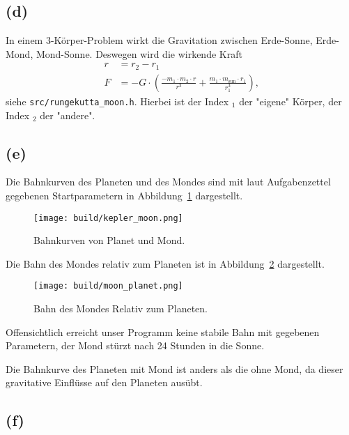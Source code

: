 \documentclass{scrartcl}
\begin{document}
\subsection*{(d)}
In einem 3-Körper-Problem wirkt die Gravitation zwischen Erde-Sonne, Erde-Mond, Mond-Sonne.
Deswegen wird die wirkende Kraft
\begin{align}
  r &= r_2 - r_1 \\
  F &= - G \cdot \left(\frac{- m_1 \cdot m_2 \cdot r}{r^3} + \frac{m_1 \cdot m_{\text{sun}} \cdot
    r_1}{r_1^3}\right)\text{,}
\end{align}
siehe \texttt{src/rungekutta\_moon.h}.
Hierbei ist der Index ${}_1$ der "eigene" Körper,
der Index ${}_2$ der "andere".
\subsection*{(e)}
Die Bahnkurven des Planeten und des Mondes sind mit laut Aufgabenzettel gegebenen Startparametern
in Abbildung~\ref{fig:kepler_moon} dargestellt.
\begin{figure}[ht]
  \centering
  \texttt{[image: build/kepler\_moon.png]}
  \caption{Bahnkurven von Planet und Mond.}%
  \label{fig:kepler_moon}
\end{figure}

Die Bahn des Mondes relativ zum Planeten ist in Abbildung~\ref{fig:moon_planet} dargestellt.
\begin{figure}[ht]
  \centering
  \texttt{[image: build/moon\_planet.png]}
  \caption{Bahn des Mondes Relativ zum Planeten.}%
  \label{fig:moon_planet}
\end{figure}

Offensichtlich erreicht unser Programm keine stabile Bahn mit gegebenen Parametern, der Mond
stürzt nach 24 Stunden in die Sonne.

Die Bahnkurve des Planeten mit Mond ist anders als die ohne Mond, da dieser gravitative Einflüsse auf den
Planeten ausübt.
\subsection*{(f)}
\end{document}
